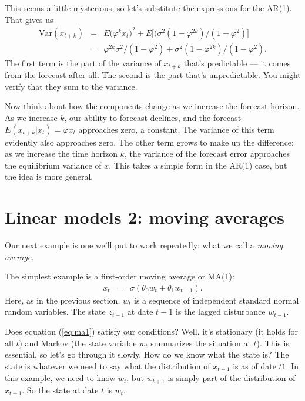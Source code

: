 \documentclass[11pt]{article}
\begin{document}
This seems a little mysterious, so let's substitute the expressions
for the AR(1).
That gives us
\begin{eqnarray*}
    \mbox{Var}(x_{t+k}) &=& E \big( \varphi^k x_t \big)^2
            + E \big[(\sigma ^2 (1-\varphi^{2k})/(1-\varphi^2)\big] \\
            &=& \varphi^{2k} \sigma ^2 /(1-\varphi^2)
            +  \sigma ^2 (1-\varphi^{2k})/(1-\varphi^2) .
\end{eqnarray*}
The first term is the part of the variance of $x_{t+k}$ that's predictable ---
it comes from the forecast after all.
The second is the part that's unpredictable.
You might verify that they sum to the variance.

Now think about how the components change as we increase the forecast horizon.
As we increase $k$, our ability to forecast declines, and the forecast
$  E (x_{t+k} | x_t ) = \varphi x_t $ approaches zero, a constant.
The variance of this term evidently also approaches zero.
The other term grows to make up the difference:
as we increase the time horizon $k$, the variance of the forecast error
approaches the equilibrium variance of $x$.
This takes a simple form in the AR(1) case, but the idea
is more general.


\section{Linear models 2:  moving averages}

Our next example is one we'll put to work repeatedly:
what we call a {\it moving average\/}.

The simplest example is  a first-order moving average
or MA(1):
\begin{eqnarray}
    x_{t}  &=& \sigma \left( \theta_0 w_{t} + \theta_1 w_{t-1} \right) .
    \label{eq:ma1}
\end{eqnarray}
Here, as in the previous section,
$w_t$ is a sequence of independent standard normal random variables.
The state $z_{t-1}$ at date $t-1$ is the lagged disturbance $w_{t-1}$.

Does equation (\ref{eq:ma1}) satisfy our conditions?
Well, it's stationary (it holds for all $t$)
and Markov (the state variable $w_t$ summarizes the situation at $t$).
This is essential, so let's go through it slowly.
How do we know what the state is?
The state is whatever we need to say what the distribution of $x_{t+1}$ is
as of date $t1$.
In this example, we need to know $w_{t}$,
but $w_{t+1}$ is simply part of the distribution of $x_{t+1}$.
So the state at date $t$ is $w_{t}$.
\end{document}
